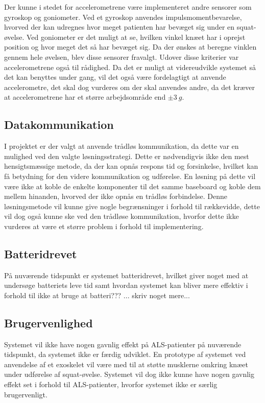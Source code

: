 Der kunne i stedet for accelerometrene være implementeret andre sensorer som gyroskop og goniometer. Ved et gyroskop anvendes impulsmomentbevarelse, hvorved der kan udregnes hvor meget patienten har bevæget sig under en squat-øvelse. Ved goniometer er det muligt at se, hvilken vinkel knæet har i oprejst position og hvor meget det så har bevæget sig. Da der ønskes at beregne vinklen gennem hele øvelsen, blev disse sensorer fravalgt. Udover disse kriterier  var accelerometrene også til rådighed. Da det er muligt at videreudvikle systemet så det kan benyttes under gang, vil det også være fordelagtigt at anvende accelerometre, det skal dog vurderes om der skal anvendes andre, da det kræver at accelerometrene har et større arbejdsområde end $\pm3~g$.

\subsection{Datakommunikation}
I projektet er der valgt at anvende trådløs kommunikation, da dette var en mulighed ved den valgte løsningsstrategi. Dette er nødvendigvis ikke den mest hensigtsmæssige metode, da der kan opnås respons tid og forsinkelse, hvilket kan få betydning for den videre kommunikation og udførelse. En løsning på dette vil være ikke at koble de enkelte komponenter til det samme baseboard og koble dem mellem hinanden, hvorved der ikke opnås en trådløs forbindelse. Denne løsningsmetode vil kunne give nogle begrænsninger i forhold til rækkevidde, dette vil dog også kunne ske ved den trådløse kommunikation, hvorfor dette ikke vurderes at være et større problem i forhold til implementering. 


\subsection{Batteridrevet}
På nuværende tidspunkt er systemet batteridrevet, hvilket giver noget med at undersøge batteriets leve tid samt hvordan systemet kan bliver mere effektiv i forhold til ikke at bruge at batteri???
... skriv noget mere...

\subsection{Brugervenlighed}
Systemet vil ikke have nogen gavnlig effekt på ALS-patienter på nuværende tidspunkt, da systemet ikke er færdig udviklet. En prototype af systemet ved anvendelse af et exoskelet vil være med til at støtte musklerne omkring knæet under udførelse af squat-øvelse. Systemet vil dog ikke kunne have nogen gavnlig effekt set i forhold til ALS-patienter, hvorfor systemet ikke er særlig brugervenligt. 

